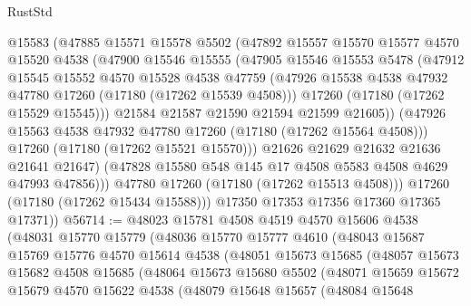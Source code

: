 \begin{lexlean}{RustStd}
\begin{coremodule}
{\begin{coremodule}
{{{{{{{{{{{{{{{{{{{{{{{{{{{{{{{{{{{{{{{{{{{{{{{{{{{{{{{                @15583
                (@47885
                  @15571
                  @15578
                  @5502
                  (@47892
                    @15557
                    @15570
                    @15577
                    @4570
                    @15520
                    @4538
                    (@47900
                      @15546
                      @15555
                      (@47905
                        @15546
                        @15553
                        @5478
                        (@47912
                          @15545
                          @15552
                          @4570
                          @15528
                          @4538
                          @47759
                          (@47926 @15538 @4538 @47932 @47780 @17260 (@17180 (@17262 @15539 @4508)))
                          @17260
                          (@17180 (@17262 @15529 @15545)))
                        @21584
                        @21587
                        @21590
                        @21594
                        @21599
                        @21605))
                    (@47926 @15563 @4538 @47932 @47780 @17260 (@17180 (@17262 @15564 @4508)))
                    @17260
                    (@17180 (@17262 @15521 @15570)))
                  @21626
                  @21629
                  @21632
                  @21636
                  @21641
                  @21647)
                (@47828 @15580 @548 @145 @17 @4508 @5583 @4508 @4629 @47993 @47856)))
            @47780
            @17260
            (@17180 (@17262 @15513 @4508)))
          @17260
          (@17180 (@17262 @15434 @15588)))
        @17350
        @17353
        @17356
        @17360
        @17365
        @17371))
@56714 := @48023
    @15781
    @4508
    @4519
    @4570
    @15606
    @4538
    (@48031
      @15770
      @15779
      (@48036
        @15770
        @15777
        @4610
        (@48043
          @15687
          @15769
          @15776
          @4570
          @15614
          @4538
          (@48051
            @15673
            @15685
            (@48057
              @15673
              @15682
              @4508
              @15685
              (@48064
                @15673
                @15680
                @5502
                (@48071
                  @15659
                  @15672
                  @15679
                  @4570
                  @15622
                  @4538
                  (@48079
                    @15648
                    @15657
                    (@48084
                      @15648
}}}}}}}}}}}}}}}}}}}}}}}}}}}}}}}}}}}}}}}}}}}}}}}}}}}}}}}
\end{coremodule}}
\end{coremodule}
\end{lexlean}
